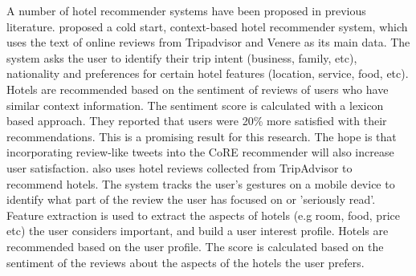 A number of hotel recommender systems have been proposed in previous literature. \cite{levi2012} proposed a cold start, context-based hotel recommender system, which uses the text of online reviews from Tripadvisor and Venere as its main data. The system asks the user to identify their trip intent (business, family, etc), nationality and preferences for certain hotel features (location, service, food, etc). Hotels are recommended based on the sentiment of reviews of users who have similar context information. The sentiment score is calculated with a lexicon based approach. They reported that users were 20\% more satisfied with their recommendations. This is a promising result for this research. The hope is that incorporating review-like tweets into the CoRE recommender will also increase user satisfaction. \cite{lin2015} also uses hotel reviews collected from TripAdvisor to recommend hotels. The system tracks the user's gestures on a mobile device to identify what part of the review the user has focused on or 'seriously read'. Feature extraction is used to extract the aspects of hotels (e.g room, food, price etc) the user considers important, and build a user interest profile. Hotels are recommended based on the user profile. The score is calculated based on the sentiment of the reviews about the aspects of the hotels the user prefers.
